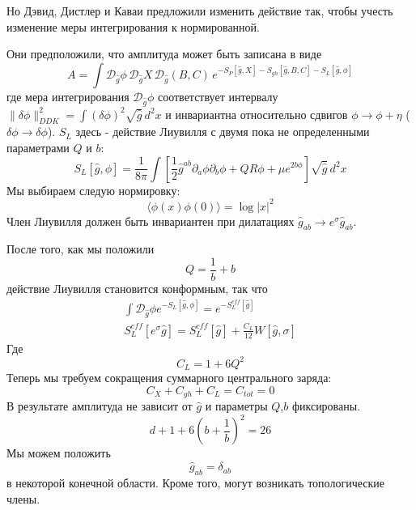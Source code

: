 \documentclass[a4paper,12pt]{article}
\theoremstyle{definition} \newtheorem{Def}{Definition}
\begin{document}
Но Дэвид, Дистлер и Каваи предложили изменить действие так, чтобы учесть изменение меры интегрирования к нормированной.

Они предположили, что амплитуда может быть записана в виде
\begin{equation}
  \label{eq:24}
  A=\int \mathcal{D}_{\hat{g}}\phi\, \mathcal{D}_{\hat{g}} X\, \mathcal{D}_{\hat{g}} (B,C)\, e^{-S_P[\hat{g},X]-S_{gh}[\hat{g},B,C]-S_L[\hat{g},\phi]}
\end{equation}
где мера интегрирования  $\mathcal{D}_{\hat{g}} \phi$ соответствует интервалу $\|\delta\phi\|^2_{DDK} = \int (\delta\phi)^2 \sqrt{\hat{g}}\, d^2x$ и инвариантна относительно сдвигов $\phi\to \phi+\eta$ ($\delta\phi\to \delta\phi$).
$S_L$ здесь - действие Лиувилля с двумя пока не определенными параметрами $Q$ и $b$:
\begin{equation}
  \label{eq:25}
  S_L[\hat{g},\phi] = \frac{1}{8\pi} \int \left[ \frac{1}{2} \hat{g}^{ab} \partial_a \phi \partial_b \phi + QR\phi +\mu e^{2b\phi}\right] \sqrt{\hat{g}} \, d^2x
\end{equation}
Мы выбираем следую нормировку:
\begin{equation}
  \label{eq:26}
  \langle \phi(x) \phi(0) \rangle = \log |x|^2
\end{equation}
Член Лиувилля должен быть инвариантен при дилатациях $\hat{g}_{ab}\to e^{\sigma}\hat{g}_{ab}$.

После того, как мы положили
\begin{equation}
  \label{eq:27}
  Q=\frac{1}{b}+b
\end{equation}
действие Лиувилля становится конформным, так что
\begin{equation}
  \label{eq:28}
  \begin{split}
    \int \mathcal{D}_{\hat{g}} \phi e^{-S_L[\hat g,\phi]} = e^{-S_L^{eff}[\hat g]}\\
    S_L^{eff} [e^{\sigma}\hat{g}]=S_L^{eff}[\hat g] +\frac{C_L}{12} W[\hat g,\sigma]
  \end{split}
\end{equation}
Где
\begin{equation}
  \label{eq:29}
  C_L=1+6 Q^2
\end{equation}
Теперь мы требуем сокращения суммарного центрального заряда:
\begin{equation}
  \label{eq:30}
  C_X+C_{gh}+C_L=C_{tot}=0
\end{equation}
В результате амплитуда не зависит от  $\hat{g}$ и параметры  $Q$,$b$ фиксированы.
\begin{equation}
  \label{eq:18}
  d+1+6\left(b+\frac{1}{b}\right)^2=26
\end{equation}
Мы можем положить
\begin{equation}
  \label{eq:31}
  \hat{g}_{ab}=\delta_{ab}
\end{equation}
в некоторой конечной области. Кроме того, могут возникать топологические члены.
\end{document}
